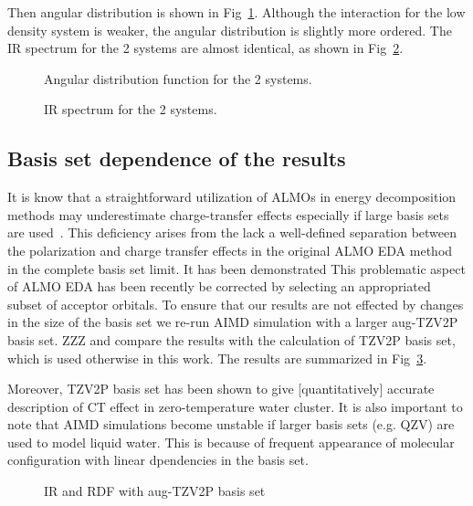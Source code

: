 \documentclass[aps,prl,reprint,amsmath,amssymb]{revtex4-1}
\begin{document}
Then angular distribution is shown in Fig~\ref{Fig:adfcp}. 
Although the interaction for the low density system is weaker, the angular distribution is slightly more ordered. 
The IR spectrum for the 2 systems are almost identical, as shown in Fig~\ref{Fig:ir_cp}.

\begin{figure}
\caption{Angular distribution function for the 2 systems.}\label{Fig:adfcp}
\end{figure} 

\begin{figure}
\caption{IR spectrum for the 2 systems.}\label{Fig:ir_cp}
\end{figure} 

\subsection{Basis set dependence of the results}

It is know that a straightforward utilization of ALMOs in energy decomposition methods may underestimate charge-transfer effects especially if large basis sets are used~\cite{horn2015polarization,herbert2016}. 
This deficiency arises from the lack a well-defined separation between the polarization and charge transfer effects in the original ALMO EDA method~\cite{khaliullin2007unravelling} in the complete basis set limit. 
It has been demonstrated This problematic aspect of ALMO EDA has been recently be corrected by selecting an appropriated subset of acceptor orbitals\cite{horn2015polarization}. 
To ensure that our results are not effected by changes in the size of the basis set we re-run AIMD simulation with a larger aug-TZV2P basis set. 
ZZZ and compare the results with the calculation of TZV2P basis set, which is used otherwise in this work. 
The results are summarized in Fig~\ref{Fig:basis}.

Moreover, TZV2P basis set has been shown to give [quantitatively] accurate description of CT effect in zero-temperature water cluster. 
It is also important to note that AIMD simulations become unstable if larger basis sets (e.g. QZV) are used to model liquid water. 
This is because of frequent appearance of molecular configuration with linear dpendencies in the basis set.

\begin{figure}
\caption{IR and RDF with aug-TZV2P basis set}\label{Fig:basis}
\end{figure} 


\fi %
\end{document}
